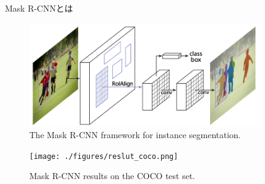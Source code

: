 \documentclass[aspectratio=169, dvipdfmx, 11pt]{beamer}
\begin{document}
\begin{frame}{Mask R-CNNとは}
    \begin{figure}[htb]
		\centering
		\includegraphics[width=10cm]{./figures/framework.png}
        \caption{The Mask R-CNN framework for instance segmentation.}
    \end{figure}
    \begin{figure}[htb]
		\centering
\texttt{[image: ./figures/reslut\_coco.png]}
\caption{Mask R-CNN results on the COCO test set. }
    \end{figure}
\end{frame}
\end{document}
